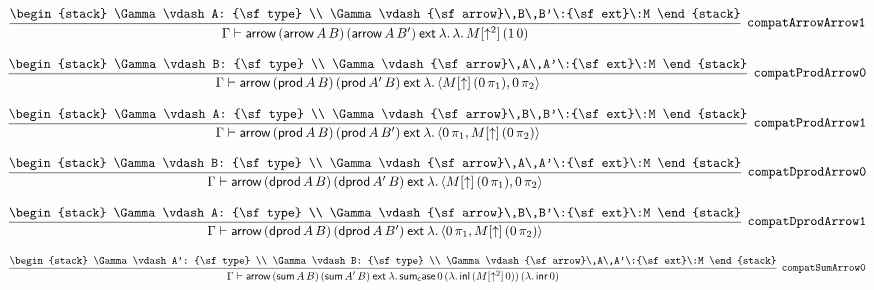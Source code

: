 \[
\infer[{\tt compatArrowArrow1}]{\Gamma \vdash {\sf arrow}\,({\sf arrow}\,A\,B)\,({\sf arrow}\,A\,B')\:{\sf ext}\:\lambda .\,\lambda .\,M[\uparrow^2]\,(1\,0)}{
\begin{stack}
\Gamma \vdash A: {\sf type}
\\
\Gamma \vdash {\sf arrow}\,B\,B'\:{\sf ext}\:M
\end{stack}}
\]

\[
\infer[{\tt compatProdArrow0}]{\Gamma \vdash {\sf arrow}\,({\sf prod}\,A\,B)\,({\sf prod}\,A'\,B)\:{\sf ext}\:\lambda .\,\langle M[\uparrow ]\,(0\, \pi_1),0\, \pi_2\rangle }{
\begin{stack}
\Gamma \vdash B: {\sf type}
\\
\Gamma \vdash {\sf arrow}\,A\,A'\:{\sf ext}\:M
\end{stack}}
\]

\[
\infer[{\tt compatProdArrow1}]{\Gamma \vdash {\sf arrow}\,({\sf prod}\,A\,B)\,({\sf prod}\,A\,B')\:{\sf ext}\:\lambda .\,\langle 0\, \pi_1,M[\uparrow ]\,(0\, \pi_2)\rangle }{
\begin{stack}
\Gamma \vdash A: {\sf type}
\\
\Gamma \vdash {\sf arrow}\,B\,B'\:{\sf ext}\:M
\end{stack}}
\]

\[
\infer[{\tt compatDprodArrow0}]{\Gamma \vdash {\sf arrow}\,({\sf dprod}\,A\,B)\,({\sf dprod}\,A'\,B)\:{\sf ext}\:\lambda .\,\langle M[\uparrow ]\,(0\, \pi_1),0\, \pi_2\rangle }{
\begin{stack}
\Gamma \vdash B: {\sf type}
\\
\Gamma \vdash {\sf arrow}\,A\,A'\:{\sf ext}\:M
\end{stack}}
\]

\[
\infer[{\tt compatDprodArrow1}]{\Gamma \vdash {\sf arrow}\,({\sf dprod}\,A\,B)\,({\sf dprod}\,A\,B')\:{\sf ext}\:\lambda .\,\langle 0\, \pi_1,M[\uparrow ]\,(0\, \pi_2)\rangle }{
\begin{stack}
\Gamma \vdash A: {\sf type}
\\
\Gamma \vdash {\sf arrow}\,B\,B'\:{\sf ext}\:M
\end{stack}}
\]

\[
\infer[{\tt compatSumArrow0}]{\Gamma \vdash {\sf arrow}\,({\sf sum}\,A\,B)\,({\sf sum}\,A'\,B)\:{\sf ext}\:\lambda .\,{\sf sum_case}\,0\,(\lambda .\,{\sf inl}\,(M[\uparrow^2]\,0))\,(\lambda .\,{\sf inr}\,0)}{
\begin{stack}
\Gamma \vdash A': {\sf type}
\\
\Gamma \vdash B: {\sf type}
\\
\Gamma \vdash {\sf arrow}\,A\,A'\:{\sf ext}\:M
\end{stack}}
\]

